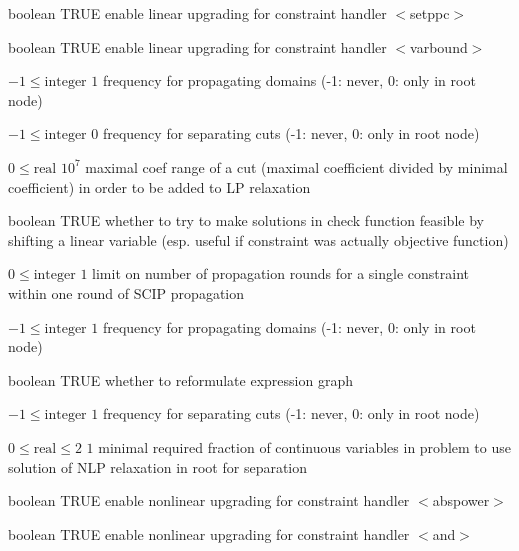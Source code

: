 %
{boolean}%
{TRUE}%
{enable linear upgrading for constraint handler $<$setppc$>$}%
{}

%
{boolean}%
{TRUE}%
{enable linear upgrading for constraint handler $<$varbound$>$}%
{}

%
{$-1\leq\textrm{integer}$}%
{$1$}%
{frequency for propagating domains (-1: never, 0: only in root node)}%
{}

%
{$-1\leq\textrm{integer}$}%
{$0$}%
{frequency for separating cuts (-1: never, 0: only in root node)}%
{}

%
{$0\leq\textrm{real}$}%
{$10^{  7}$}%
{maximal coef range of a cut (maximal coefficient divided by minimal coefficient) in order to be added to LP relaxation}%
{}

%
{boolean}%
{TRUE}%
{whether to try to make solutions in check function feasible by shifting a linear variable (esp. useful if constraint was actually objective function)}%
{}

%
{$0\leq\textrm{integer}$}%
{$1$}%
{limit on number of propagation rounds for a single constraint within one round of SCIP propagation}%
{}

%
{$-1\leq\textrm{integer}$}%
{$1$}%
{frequency for propagating domains (-1: never, 0: only in root node)}%
{}

%
{boolean}%
{TRUE}%
{whether to reformulate expression graph}%
{}

%
{$-1\leq\textrm{integer}$}%
{$1$}%
{frequency for separating cuts (-1: never, 0: only in root node)}%
{}

%
{$0\leq\textrm{real}\leq2$}%
{$1$}%
{minimal required fraction of continuous variables in problem to use solution of NLP relaxation in root for separation}%
{}

%
{boolean}%
{TRUE}%
{enable nonlinear upgrading for constraint handler $<$abspower$>$}%
{}

%
{boolean}%
{TRUE}%
{enable nonlinear upgrading for constraint handler $<$and$>$}%
{}

